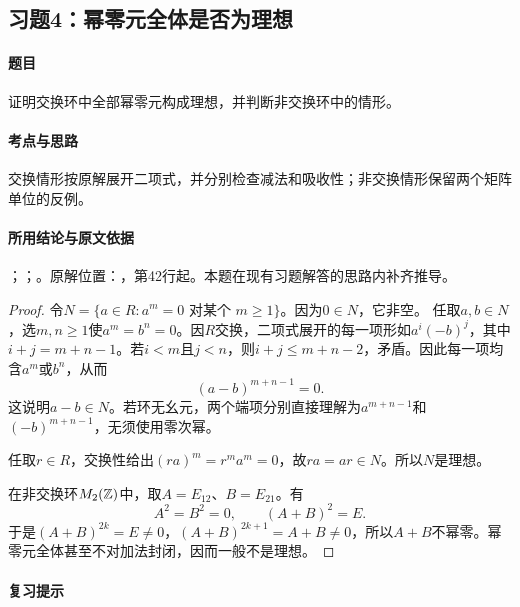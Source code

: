 \subsection{习题4：幂零元全体是否为理想}

\label{ex:3:4}

\paragraph{题目}

证明交换环中全部幂零元构成理想，并判断非交换环中的情形。

\paragraph{考点与思路}

交换情形按原解展开二项式，并分别检查减法和吸收性；非交换情形保留两个矩阵单位的反例。

\paragraph{所用结论与原文依据}

；；。原解位置：，第42行起。本题在现有习题解答的思路内补齐推导。


\begin{proof}

令$N=\{a\in R:a^m=0\text{ 对某个 }m\ge1\}$。因为$0\in N$，它非空。
任取$a,b\in N$，选$m,n\ge1$使$a^m=b^n=0$。因$R$交换，二项式展开的每一项形如$a^i(-b)^j$，其中$i+j=m+n-1$。若$i<m$且$j<n$，则$i+j\le m+n-2$，矛盾。因此每一项均含$a^m$或$b^n$，从而
\[
(a-b)^{m+n-1}=0.
\]
这说明$a-b\in N$。若环无幺元，两个端项分别直接理解为$a^{m+n-1}$和$(-b)^{m+n-1}$，无须使用零次幂。

任取$r\in R$，交换性给出$(ra)^m=r^ma^m=0$，故$ra=ar\in N$。所以$N$是理想。

在非交换环$M_2(\mathbb Z)$中，取$A=E_{12}$、$B=E_{21}$。有
\[
A^2=B^2=0,\qquad (A+B)^2=E.
\]
于是$(A+B)^{2k}=E\ne0$，$(A+B)^{2k+1}=A+B\ne0$，所以$A+B$不幂零。幂零元全体甚至不对加法封闭，因而一般不是理想。

\end{proof}

\paragraph{复习提示}

